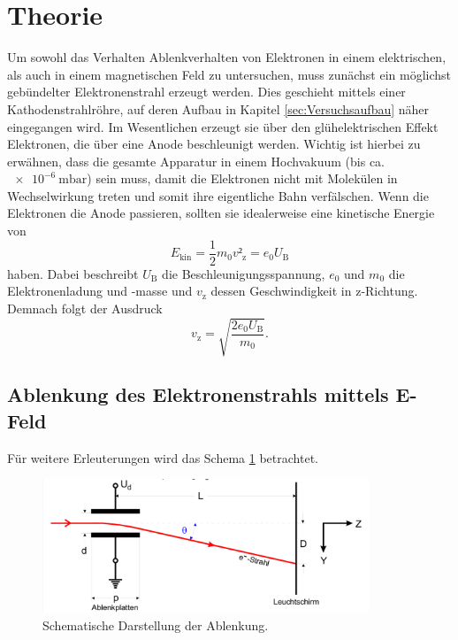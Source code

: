 \section{Theorie}
\label{sec:Theorie}

Um sowohl das Verhalten Ablenkverhalten von Elektronen in einem elektrischen, als auch in einem magnetischen Feld zu untersuchen, muss zunächst ein möglichst gebündelter Elektronenstrahl erzeugt werden.
Dies geschieht mittels einer Kathodenstrahlröhre, auf deren Aufbau in Kapitel \ref{sec:Versuchsaufbau} näher eingegangen wird.
Im Wesentlichen erzeugt sie über den glühelektrischen Effekt Elektronen, die über eine Anode beschleunigt werden.
Wichtig ist hierbei zu erwähnen, dass die gesamte Apparatur in einem Hochvakuum (bis ca. $\SI{e-6}{\milli\bar}$) sein muss, damit die Elektronen nicht mit Molekülen in Wechselwirkung treten und somit ihre eigentliche Bahn verfälschen.
Wenn die Elektronen die Anode passieren, sollten sie idealerweise eine kinetische Energie von
\begin{equation}
  E_{\text{kin}} = \frac{1}{2}m_0 v²_{\text{z}} = e_0 U_{\text{B}}
\end{equation}
haben.
Dabei beschreibt $U_{\text{B}}$ die Beschleunigungsspannung, $e_0$ und $m_0$ die Elektronenladung und -masse und $v_{\text{z}}$ dessen Geschwindigkeit in z-Richtung.
Demnach folgt der Ausdruck
\begin{equation}
  v_{\text{z}} = \sqrt{\frac{2 e_0 U_{\text{B}}}{m_0}}.
\end{equation}

\subsection{Ablenkung des Elektronenstrahls mittels E-Feld}
Für weitere Erleuterungen wird das Schema \ref{fig:1} betrachtet.

\begin{figure}
  \centering
  \includegraphics[height=4cm]{ressources/schema.png}
  \caption{Schematische Darstellung der Ablenkung. \cite{skript}}
  \label{fig:1}
\end{figure}


